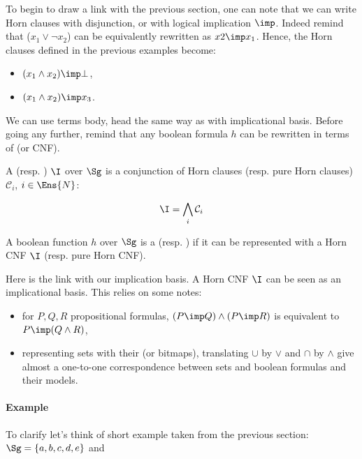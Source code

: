 \vspace{1.2em}

To begin to draw a link with the previous section, one can note that we can 
write Horn clauses with disjunction, or with logical implication $\imp$. Indeed
remind that ($x_1 \lor \lnot x_2 $) can be equivalently rewritten as $x2 \imp 
x_1$. Hence, the Horn clauses defined in the previous examples become:
\begin{itemize}
	\item $(x_1 \land x_2) \imp \bot$,
	\item $(x_1 \land x_2) \imp x_3$.
\end{itemize}
\noindent We can use terms body, head the same way as with implicational basis. 
Before going any further, remind that any boolean formula $h$ can be 
rewritten in terms of  (or CNF). 

\begin{definition} A  (resp. 
) $\I$ over $\Sg$ is a conjunction of Horn clauses (resp. pure Horn
clauses) $\mathcal{C}_i$, $i \in \Ens{N}$:

	\[ \I = \bigwedge_{i} \mathcal{C}_i\]
	
\end{definition}

\begin{definition} A boolean function $h$ over 
$\Sg$
is a  (resp. ) if it can be 
represented with a Horn CNF $\I$ (resp. pure Horn CNF).
	
\end{definition}

Here is the link with our implication basis. A Horn CNF $\I$ can be seen as an
implicational basis. This relies on some notes:
\begin{itemize}
	\item for $P, Q, R$ propositional formulas, $(P \imp Q) \land (P \imp R)$ 
	is equivalent to $P \imp (Q \land R)$,
	\item representing sets with their  (or 
	bitmaps), translating $\cup$ by $\lor$ and $\cap$ by $\land$ give almost
	a one-to-one correspondence between sets and boolean formulas and their 
	models.
\end{itemize}

\paragraph{Example} To clarify let's think of short example taken from the 
previous section: $\Sg = \{ a, b, c, d, e \}$ and 

